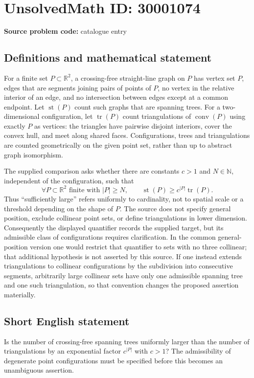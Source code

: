 \documentclass[11pt]{article}
\newcommand{\N}{\mathbb{N}}
\newcommand{\R}{\mathbb{R}}
\begin{document}
\section*{UnsolvedMath ID: 30001074}
\textbf{Source problem code:} catalogue entry
\subsection{Definitions and mathematical statement}
For a finite set $P\subset\R^2$, a crossing-free straight-line graph on $P$ has vertex set $P$, edges that are segments joining pairs of points of $P$, no vertex in the relative interior of an edge, and no intersection between edges except at a common endpoint. Let $\operatorname{st}(P)$ count such graphs that are spanning trees. For a two-dimensional configuration, let $\operatorname{tr}(P)$ count triangulations of $\operatorname{conv}(P)$ using exactly $P$ as vertices: the triangles have pairwise disjoint interiors, cover the convex hull, and meet along shared faces. Configurations, trees and triangulations are counted geometrically on the given point set, rather than up to abstract graph isomorphism.

The supplied comparison asks whether there are constants $c>1$ and $N\in\N$, independent of the configuration, such that
\[
 \forall P\subset\R^2\text{ finite with }|P|\geq N,
 \qquad \operatorname{st}(P)\geq c^{|P|}\operatorname{tr}(P).
\]
Thus ``sufficiently large'' refers uniformly to cardinality, not to spatial scale or a threshold depending on the shape of $P$. The source does not specify general position, exclude collinear point sets, or define triangulations in lower dimension. Consequently the displayed quantifier records the supplied target, but its admissible class of configurations requires clarification. In the common general-position version one would restrict that quantifier to sets with no three collinear; that additional hypothesis is not asserted by this source. If one instead extends triangulations to collinear configurations by the subdivision into consecutive segments, arbitrarily large collinear sets have only one admissible spanning tree and one such triangulation, so that convention changes the proposed assertion materially.
\subsection{Short English statement}
Is the number of crossing-free spanning trees uniformly larger than the number of triangulations by an exponential factor $c^{|P|}$ with $c>1$? The admissibility of degenerate point configurations must be specified before this becomes an unambiguous assertion.
\end{document}

